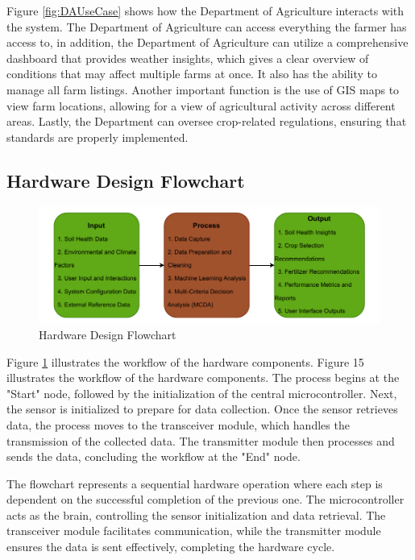 {	Figure \ref{fig:DAUseCase} shows how the Department of Agriculture interacts with the system. The Department of Agriculture can access everything the farmer has access to, in addition, the Department of Agriculture can utilize a comprehensive dashboard that provides weather insights, which gives a clear overview of conditions that may affect multiple farms at once.  It also has the ability to manage all farm listings. Another important function is the use of GIS maps to view farm locations, allowing for a view of agricultural activity across different areas. Lastly, the Department can oversee crop-related regulations, ensuring that standards are properly implemented.
	
	\subsection{Hardware Design Flowchart}
	\begin{figure}[H]
		\centering
		\caption{Hardware Design Flowchart}
		\label{fig:HardwareFlowchart}
		\includegraphics[width=1\textwidth]{figures/IPO.pdf}
	\end{figure}
	
	Figure \ref{fig:HardwareFlowchart} illustrates the workflow of the hardware components. Figure 15 illustrates the workflow of the hardware components. The process begins at the "Start" node, followed by the initialization of the central microcontroller. Next, the sensor is initialized to prepare for data collection. Once the sensor retrieves data, the process moves to the transceiver module, which handles the transmission of the collected data. The transmitter module then processes and sends the data, concluding the workflow at the "End" node.
	
	The flowchart represents a sequential hardware operation where each step is dependent on the successful completion of the previous one. The microcontroller acts as the brain, controlling the sensor initialization and data retrieval. The transceiver module facilitates communication, while the transmitter module ensures the data is sent effectively, completing the hardware cycle.
	
}
